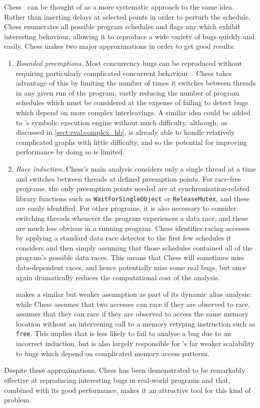 Chess~\cite{Musuvathi2008} can be thought of as a more systematic
approach to the same idea.  Rather than inserting delays at selected
points in order to perturb the schedule, Chess enumerates all possible
program schedules and flags any which exhibit interesting behaviour,
allowing it to reproduce a wide variety of bugs quickly and easily.
Chess makes two major approximations in order to get good results:
\begin{enumerate}
\item \emph{Bounded preemptions}. Most concurrency bugs can be
  reproduced without requiring particularly complicated concurrent
  behaviour~\cite{Musuvathi2007}.  Chess takes advantage of this by
  limiting the number of times it switches between threads in any
  given run of the program, vastly reducing the number of program
  schedules which must be considered at the expense of failing to
  detect bugs which depend on more complex interleavings.  A similar
  idea could be added to {\technique}'s symbolic execution engine
  without much difficulty, although, as discussed in
  \autoref{sect:eval:complex_hb}, {\technique} is already able to
  handle relatively complicated graphs with little difficulty, and so
  the potential for improving performance by doing so is limited.
\item \emph{Race induction}. Chess's main analysis considers only a
  single thread at a time and switches between threads at defined
  preemption points.  For race-free programs, the only preemption
  points needed are at synchronisation-related library functions such
  as \texttt{WaitForSingleObject} or \texttt{ReleaseMutex}, and these
  are easily identified.  For other programs, it is also necessary to
  consider switching threads whenever the program experiences a data
  race, and these are much less obvious in a running program.  Chess
  identifies racing accesses by applying a standard data race detector
  to the first few schedules it considers and then simply assuming
  that those schedules contained all of the program's possible data
  races.  This means that Chess will sometimes miss data-dependent
  races, and hence potentially miss some real bugs, but once again
  dramatically reduces the computational cost of the analysis.

  {\Technique} makes a similar but weaker assumption as part of its
  dynamic alias analysis: while Chess assumes that two accesses can
  race if they are observed to race, {\technique} assumes that they
  can race if they are observed to access the same memory location
  without an intervening call to a memory retyping instruction such as
  \texttt{free}.  This implies that {\technique} is less likely to
  fail to analyse a bug due to an incorrect induction, but is also
  largely responsible for {\technique}'s far weaker scalability to
  bugs which depend on complicated memory access patterns.
\end{enumerate}
Despite these approximations, Chess has been demonstrated to be
remarkably effective at reproducing interesting bugs in real-world
programs and that, combined with its good performance, makes it an
attractive tool for this kind of problem.

